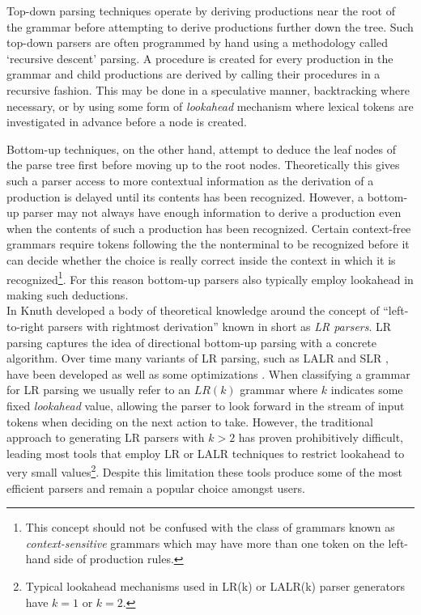 \documentclass[a4paper,11pt]{article}
\begin{document}
Top-down parsing techniques operate by deriving productions near the root of the grammar before attempting to derive productions further down the tree.
Such top-down parsers are often programmed by hand using a methodology called `recursive descent' parsing.
A procedure is created for every production in the grammar and child productions are derived by calling their procedures in a recursive fashion.
This may be done in a speculative manner, backtracking where necessary, or by using some form of \emph{lookahead} mechanism where lexical tokens are investigated in advance before a node is created.

Bottom-up techniques, on the other hand, attempt to deduce the leaf nodes of the parse tree first before moving up to the root nodes. 
Theoretically this gives such a parser access to more contextual information %
as the derivation of a production is delayed until its contents has been recognized.
However, a bottom-up parser may not always have enough information to derive a production even when the contents of such a production has been recognized. 
Certain context-free grammars require tokens following the the nonterminal to be recognized before it can decide whether the choice is really correct inside the context in which it is recognized\footnote{This concept should not be confused with the class of grammars known as \emph{context-sensitive} grammars which may have more than one token on the left-hand side of production rules.}.
For this reason bottom-up parsers also typically employ lookahead in making such deductions.\\

In \cite{knuth65} Knuth developed a body of theoretical knowledge around the concept of ``left-to-right parsers with rightmost derivation'' known in short as \emph{LR parsers}. 
LR parsing captures the idea of directional bottom-up parsing with a concrete algorithm.
Over time many variants of LR parsing, such as LALR and SLR \cite{362625}, have been developed as well as some optimizations \cite{13326}.
When classifying a grammar for LR parsing we usually refer to an $LR(k)$ grammar where $k$ indicates some fixed \emph{lookahead} value, allowing the parser to look forward in the stream of input tokens when deciding on the next action to take.
However, the traditional approach to generating LR parsers with $k > 2$ has proven prohibitively difficult, leading most tools that employ LR or LALR techniques to restrict lookahead to very small values\footnote{Typical lookahead mechanisms used in LR(k) or LALR(k) parser generators have $k = 1$ or $k = 2$.}.
Despite this limitation these tools produce some of the most efficient parsers and remain a popular choice amongst users.
\end{document}

